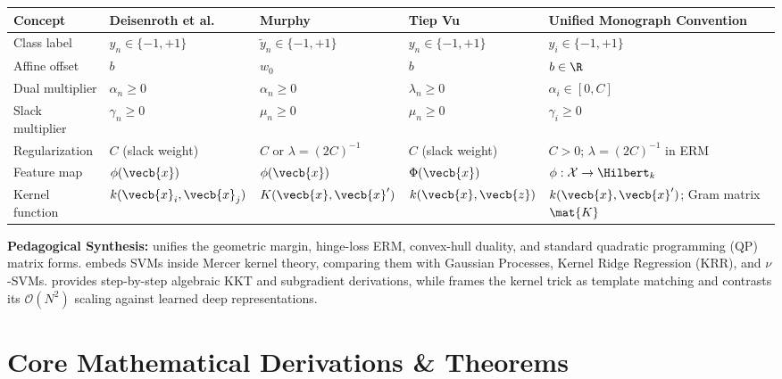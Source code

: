 \documentclass[../../../../master.tex]{subfiles}
\begin{document}
\begin{crossbook}
\small
\begin{tabularx}{\textwidth}{@{}p{2.7cm}p{2.3cm}p{2.6cm}p{2.5cm}X@{}}
\toprule
\textbf{Concept} & \textbf{Deisenroth et al.} & \textbf{Murphy} & \textbf{Tiep Vu} & \textbf{Unified Monograph Convention} \\
\midrule
Class label & $y_n \in \{-1, +1\}$ & $\tilde{y}_n \in \{-1, +1\}$ & $y_n \in \{-1, +1\}$ & $y_i \in \{-1, +1\}$ \\
Affine offset & $b$ & $w_0$ & $b$ & $b \in \R$ \\
Dual multiplier & $\alpha_n \ge 0$ & $\alpha_n \ge 0$ & $\lambda_n \ge 0$ & $\alpha_i \in [0, C]$ \\
Slack multiplier & $\gamma_n \ge 0$ & $\mu_n \ge 0$ & $\mu_n \ge 0$ & $\gamma_i \ge 0$ \\
Regularization & $C$ (slack weight) & $C$ or $\lambda = (2C)^{-1}$ & $C$ (slack weight) & $C > 0$; $\lambda = (2C)^{-1}$ in ERM \\
Feature map & $\phi(\vecb{x})$ & $\phi(\vecb{x})$ & $\Phi(\vecb{x})$ & $\phi : \mathcal{X} \to \Hilbert_k$ \\
Kernel function & $k(\vecb{x}_i, \vecb{x}_j)$ & $K(\vecb{x}, \vecb{x}')$ & $k(\vecb{x}, \vecb{z})$ & $k(\vecb{x}, \vecb{x}')$; Gram matrix $\mat{K}$ \\
\bottomrule
\end{tabularx}
\vspace{4pt}\par
\footnotesize
\textbf{Pedagogical Synthesis:}  unifies the geometric margin, hinge-loss ERM, convex-hull duality, and standard quadratic programming (QP) matrix forms.  embeds SVMs inside Mercer kernel theory, comparing them with Gaussian Processes, Kernel Ridge Regression (KRR), and $\nu$-SVMs.  provides step-by-step algebraic KKT and subgradient derivations, while  frames the kernel trick as template matching and contrasts its $\mathcal{O}(N^2)$ scaling against learned deep representations.
\end{crossbook}

\section{Core Mathematical Derivations \& Theorems}
\end{document}
